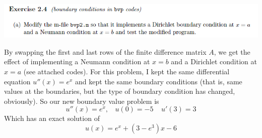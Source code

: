 \documentclass{article}
\begin{document}
\includegraphics[scale = 0.75]{prob4a.PNG}
\newline\newline

By swapping the first and last rows of the finite difference matrix $A$, we get the effect of implementing a Neumann condition at $x = b$ and a Dirichlet condition at $x = a$ (see attached codes). For this problem, I kept the same differential equation $u''(x) = e^x$ and kept the same boundary conditions (that is, same values at the boundaries, but the type of boundary condition has changed, obviously). So our new boundary value problem is
\[u''(x) = e^x, \:\:\:\: u(0) = -5 \:\:\:\:\: u'(3) = 3\]
Which has an exact solution of
\[u(x) = e^x + (3 - e^3)x - 6\]
\end{document}
